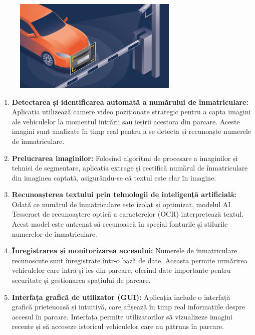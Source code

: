 \documentclass[a4paper,12pt]{report}
\begin{document}
\begin{figure}[h!]
    \centering
    \includegraphics[width=0.7\textwidth]{images/picture.jpg}
\end{figure}
\FloatBarrier

\begin{enumerate}[label=\Roman*.]
    \item \textbf{Detectarea și identificarea automată a numărului de înmatriculare:} Aplicația utilizează camere video poziționate strategic pentru a capta imagini ale vehiculelor la momentul intrării sau ieșirii acestora din parcare. Aceste imagini sunt analizate în timp real pentru a se detecta și recunoaște numerele de înmatriculare.
    \item \textbf{Prelucrarea imaginilor:} Folosind algoritmi de procesare a imaginilor și tehnici de segmentare, aplicația extrage și rectifică numărul de înmatriculare din imaginea captată, asigurându-se că textul este clar în imagine.
    \item \textbf{Recunoașterea textului prin tehnologii de inteligență artificială:} Odată ce numărul de înmatriculare este izolat și optimizat, modelul AI Tesseract de recunoaștere optică a caracterelor (OCR) interpretează textul. Acest model este antrenat să recunoască în special fonturile și stilurile numerelor de înmatriculare.
    \item \textbf{Înregistrarea și monitorizarea accesului:} Numerele de înmatriculare recunoscute sunt înregistrate într-o bază de date. Aceasta permite urmărirea vehiculelor care intră și ies din parcare, oferind date importante pentru securitate și gestionarea spațiului de parcare.
    \item \textbf{Interfața grafică de utilizator (GUI):} Aplicația include o interfață grafică prietenoasă și intuitivă, care afișează în timp real informațiile despre accesul în parcare. Interfața permite utilizatorilor să vizualizeze imagini recente și să acceseze istoricul vehiculelor care au pătruns în parcare.
\end{enumerate}
\end{document}

